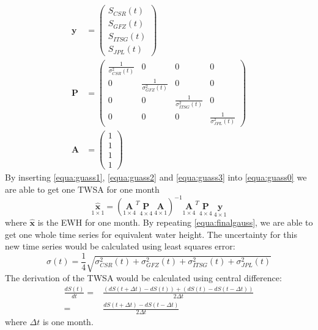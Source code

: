 \begin{align}
\bm{y} &= \begin{pmatrix} \label{equa:guass1}
S_{CSR}(t)\\
S_{GFZ}(t)\\
S_{ITSG}(t)\\
S_{JPL}(t)
\end{pmatrix} \\
\bm{P} &= \begin{pmatrix} \label{equa:guass2}
\frac{1}{\sigma^2_{CSR}(t)} & 0 & 0 & 0 \\
0 & \frac{1}{\sigma^2_{GFZ}(t)} & 0 & 0 \\
0 & 0 & \frac{1}{\sigma^2_{ITSG}(t)} & 0 \\
0 & 0 & 0 & \frac{1}{\sigma^2_{JPL}(t)}
\end{pmatrix}\\
\bm{A} &= \begin{pmatrix} \label{equa:guass3}
1\\
1\\
1\\
1
\end{pmatrix}
\end{align}
By inserting \autoref{equa:guass1}, \autoref{equa:guass2} and \autoref{equa:guass3} into \autoref{equa:guass0} we are able to get one TWSA for one month
\begin{equation} \label{equa:finalgauss}
\underset{1 \times 1}{\hat{\bm{x}}} = (\underset{1 \times 4}{\bm{A}}^T \underset{4 \times 4}{\bm{P}} \  \underset{4 \times 1}{\bm{A}})^{-1} \underset{1 \times 4}{\bm{A}}^T \underset{4 \times 4}{\bm{P}} \  \underset{4 \times 1}{\bm{y}}
\end{equation}
where $\hat{\bm{x}}$ is the EWH for one month. By repeating \autoref{equa:finalgauss}, we are able to get one whole time series for equivalent water height. The uncertainty for this new time series would be calculated using least squares error:
\begin{equation}
	\sigma(t) = \frac{1}{4}\sqrt{\sigma^2_{CSR}(t)+\sigma^2_{GFZ}(t)+\sigma^2_{ITSG}(t)+\sigma^2_{JPL}(t)}
\end{equation}
The derivation of the TWSA would be calculated using central difference:
\begin{align}\label{eq:dsdt}
\frac{dS(t)}{dt} = &\frac{(dS(t+\Delta t) - dS(t)) + (dS(t) - dS(t-\Delta t))}{2 \Delta t}\\
= & \frac{dS(t+\Delta t) - dS(t-\Delta t)}{2 \Delta t}
\end{align}
where $\Delta t$ is one month. 
